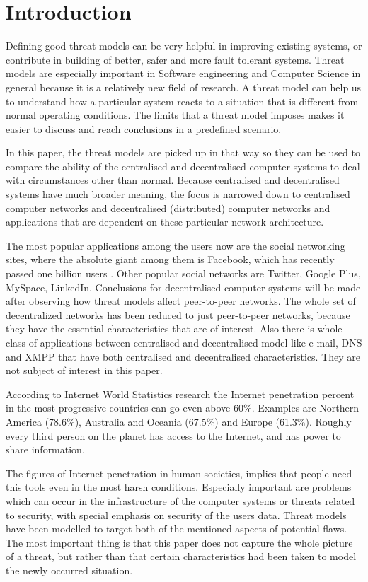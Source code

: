 \section{Introduction}
Defining good threat models can be very helpful in improving existing systems, or contribute in building of better, safer and more fault tolerant systems. Threat models are especially important in Software engineering and Computer Science in general because it is a relatively new field of research. A threat model can help us to understand how a particular system reacts to a situation that is different from normal operating conditions. The limits that a threat model imposes makes it easier to discuss and reach conclusions in a predefined scenario.

In this paper, the threat models are picked up in that way so they can be used to compare the ability of the centralised and decentralised computer systems to deal with circumstances other than normal. Because centralised and decentralised systems have much broader meaning, the focus is narrowed down to centralised computer networks and decentralised (distributed) computer networks and applications that are dependent on these particular network architecture. 

The most popular applications among the users now are the social networking sites, where the absolute giant among them is Facebook, which has recently passed one billion users \cite{web:facebookpassesbillion}. Other popular social networks are Twitter, Google Plus, MySpace, LinkedIn. Conclusions for decentralised computer systems will be made after observing how threat models affect peer-to-peer networks. The whole set of decentralized networks has been reduced to just peer-to-peer networks, because they have the essential characteristics that are of interest. Also there is whole class of applications between centralised and decentralised model like e-mail, DNS and XMPP that have both centralised and decentralised characteristics. They are not subject of interest in this paper.

According to Internet World Statistics research \cite{web:internetworldstats} the Internet penetration percent in the most progressive countries can go even above 60\%. Examples are Northern America (78.6\%), Australia and Oceania (67.5\%) and Europe (61.3\%). Roughly every third person on the planet has access to the Internet, and has power to share information. 

The figures of Internet penetration \cite{web:internetworldstats} in human societies, implies that people need this tools even in the most harsh conditions. Especially important are problems which can occur in the infrastructure of the computer systems or threats related to security, with special emphasis on security of the users data. Threat models have been modelled to target both of the mentioned aspects of potential flaws. The most important thing is that this paper does not capture the whole picture of a threat, but rather than that certain characteristics had been taken to model the newly occurred situation.

